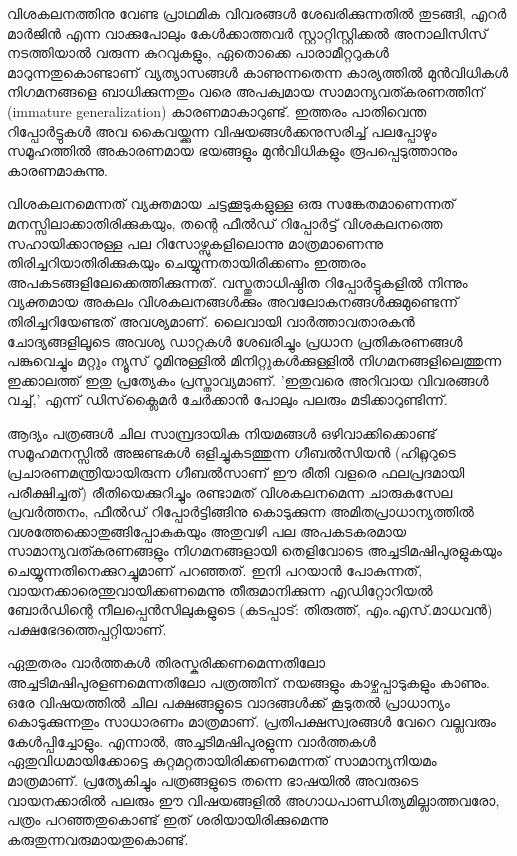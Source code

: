 വിശകലനത്തിനു വേണ്ട പ്രാഥമിക വിവരങ്ങള്‍ ശേഖരിക്കുന്നതില്‍ തുടങ്ങി, എറര്‍ മാര്‍ജിന്‍ എന്ന വാക്കുപോലും 
കേള്‍ക്കാത്തവര്‍ സ്റ്റാറ്റിസ്റ്റിക്കല്‍ അനാലിസിസ് നടത്തിയാല്‍ വരുന്ന കുറവുകളും, ഏതൊക്കെ പാരാമീറ്ററുകള്‍ 
മാറുന്നതുകൊണ്ടാണ് വ്യത്യാസങ്ങള്‍ കാണുന്നതെന്ന കാര്യത്തില്‍ മുന്‍വിധികള്‍ നിഗമനങ്ങളെ ബാധിക്കുന്നതും വരെ 
അപക്വമായ സാമാന്യവത്കരണത്തിന് (immature generalization) കാരണമാകാറുണ്ട്. ഇത്തരം പാതിവെന്ത 
റിപ്പോര്‍ട്ടുകള്‍ അവ കൈവയ്ക്കുന്ന വിഷയങ്ങള്‍ക്കനുസരിച്ച് പലപ്പോഴും സമൂഹത്തില്‍ അകാരണമായ ഭയങ്ങളും 
മുന്‍വിധികളും രൂപപ്പെടുത്താനും കാരണമാകുന്നു.

വിശകലനമെന്നത് വ്യക്തമായ ചട്ടക്കൂടുകളുള്ള ഒരു സങ്കേതമാണെന്നത് മനസ്സിലാക്കാതിരിക്കുകയും, തന്റെ ഫീല്‍ഡ് 
റിപ്പോര്‍ട്ട് വിശകലനത്തെ സഹായിക്കാനുള്ള പല റിസോഴ്സുകളിലൊന്നു മാത്രമാണെന്നു തിരിച്ചറിയാതിരിക്കുകയും 
ചെയ്യുന്നതായിരിക്കണം ഇത്തരം അപകടങ്ങളിലേക്കെത്തിക്കുന്നത്. വസ്തുതാധിഷ്ഠിത റിപ്പോര്‍ട്ടുകളില്‍ നിന്നും 
വ്യക്തമായ അകലം വിശകലനങ്ങള്‍ക്കും അവലോകനങ്ങള്‍ക്കുമുണ്ടെന്ന് തിരിച്ചറിയേണ്ടത് അവശ്യമാണ്. ലൈവായി 
വാര്‍ത്താവതാരകന്‍ ചോദ്യങ്ങളിലൂടെ അവശ്യ ഡാറ്റകള്‍ ശേഖരിച്ചും പ്രധാന പ്രതികരണങ്ങള്‍ പങ്കുവെച്ചും മറ്റും ന്യൂസ് 
റൂമിനുള്ളില്‍ മിനിറ്റുകള്‍ക്കുള്ളില്‍ നിഗമനങ്ങളിലെത്തുന്ന ഇക്കാലത്ത് ഇതു പ്രത്യേകം പ്രസ്താവ്യമാണ്. 'ഇതുവരെ അറിവായ 
വിവരങ്ങള്‍ വച്ച്,' എന്ന് ഡിസ്‌ക്ലൈമര്‍ ചേര്‍ക്കാന്‍ പോലും പലരും മടിക്കാറുണ്ടിന്ന്.‌

ആദ്യം പത്രങ്ങള്‍ ചില സാമ്പ്രദായിക നിയമങ്ങള്‍ ഒഴിവാക്കിക്കൊണ്ട് സമൂഹമനസ്സില്‍ അജണ്ടകള്‍ ഒളിച്ചുകടത്തുന്ന 
ഗീബല്‍സിയന്‍ (ഹിറ്റ്ലറുടെ പ്രചാരണമന്ത്രിയായിരുന്ന ഗീബല്‍സാണ് ഈ രീതി വളരെ ഫലപ്രദമായി പരീക്ഷിച്ചത്) 
രീതിയെക്കുറിച്ചും രണ്ടാമത് വിശകലനമെന്ന ചാരുകസേല പ്രവര്‍ത്തനം, ഫീല്‍ഡ് റിപ്പോര്‍ട്ടിങ്ങിനു കൊടുക്കുന്ന 
അമിതപ്രാധാന്യത്തില്‍ വശത്തേക്കൊതുങ്ങിപ്പോകുകയും അതുവഴി പല അപകടകരമായ സാമാന്യവത്കരണങ്ങളും 
നിഗമനങ്ങളായി തെളിവോടെ അച്ചടിമഷിപുരളുകയും ചെയ്യുന്നതിനെക്കുറച്ചുമാണ് പറഞ്ഞത്. ഇനി പറയാന്‍ പോകുന്നത്, 
വായനക്കാരെന്തുവായിക്കണമെന്നു തീരുമാനിക്കുന്ന എഡിറ്റോറിയല്‍ ബോര്‍ഡിന്റെ നീലപ്പെന്‍സിലുകളുടെ 
(കടപ്പാട്: തിരുത്ത്, എം.എസ്.മാധവന്‍) പക്ഷഭേദത്തെപ്പറ്റിയാണ്.

ഏതുതരം വാര്‍ത്തകള്‍ തിരസ്കരിക്കണമെന്നതിലോ അച്ചടിമഷിപുരളണമെന്നതിലോ പത്രത്തിന് നയങ്ങളും 
കാഴ്ചപ്പാടുകളും കാണും. ഒരേ വിഷയത്തില്‍ ചില പക്ഷങ്ങളുടെ വാദങ്ങള്‍ക്ക് കൂടുതല്‍ പ്രാധാന്യം കൊടുക്കുന്നതും 
സാധാരണം മാത്രമാണ്. പ്രതിപക്ഷസ്വരങ്ങള്‍ വേറെ വല്ലവരും കേള്‍പ്പിച്ചോളും. എന്നാല്‍, അച്ചടിമഷിപുരളുന്ന 
വാര്‍ത്തകള്‍ ഏതുവിധമായിക്കോട്ടെ കുറ്റമറ്റതായിരിക്കണമെന്നത് സാമാന്യനിയമം മാത്രമാണ്. പ്രത്യേകിച്ചും 
പത്രങ്ങളുടെ തന്നെ ഭാഷയില്‍ അവരുടെ വായനക്കാരില്‍ പലരും ഈ വിഷയങ്ങളില്‍ 
അഗാധപാണ്ഡിത്യമില്ലാത്തവരോ, പത്രം പറഞ്ഞതുകൊണ്ട് ഇത് ശരിയായിരിക്കുമെന്നു കരുതുന്നവരുമായതുകൊണ്ട്.

